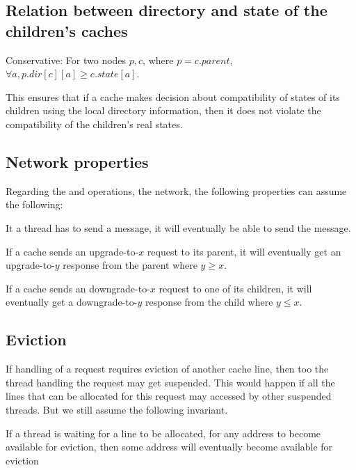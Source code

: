 \subsection{Relation between directory and state of the children's caches}
\begin{theorem}
Conservative: For two nodes $p, c$, where $p = c.parent$, $\forall a,
p.dir[c][a] \ge c.state[a]$.  \label{conservative}
\end{theorem}

This ensures that if a cache makes decision about compatibility of states of
its children using the local directory information, then it does not violate the
compatibility of the children's real states.

\subsection{Network properties}
Regarding the \send{} and \receive{} operations, \ie the network, the following
properties can assume the following:
\begin{theorem}
It a thread has to send a message, it will eventually be able to send the
message.
\label{canSend}
\end{theorem}

\begin{theorem}
If a cache sends an upgrade-to-$x$ request to its parent, it will eventually
get an upgrade-to-$y$ response from the parent where $y \ge x$.
\label{willRecv}
\end{theorem}

\begin{theorem}
If a cache sends an downgrade-to-$x$ request to one of its children, it will
eventually get a downgrade-to-$y$ response from the child where $y \le x$.
\label{willRecv2}
\end{theorem}

\subsection{Eviction}
If handling of a request requires eviction of another cache line, then too the
thread handling the request may get suspended. This would happen if all the
lines that can be allocated for this request may accessed by other suspended
threads. But we still assume the following invariant.

\begin{theorem}
If a thread is waiting for a line to be allocated, \ie for any address to become
available for eviction, then some address will eventually become available for
eviction
\label{evictDead}
\end{theorem}

